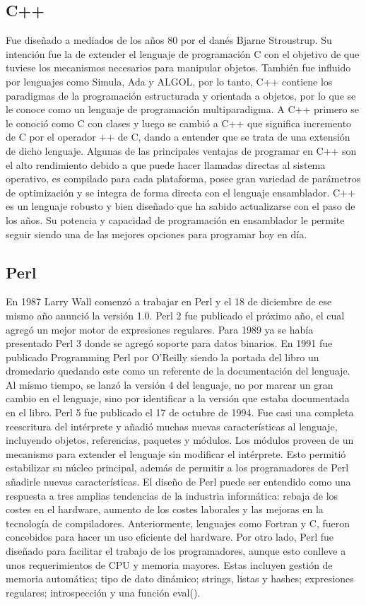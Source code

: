 \documentclass[twoside,twocolumn]{article}
\begin{document}
\subsection{C++}
Fue diseñado a mediados de los años 80 por el danés Bjarne Stroustrup. Su intención fue la de extender el lenguaje de programación C con el objetivo de que tuviese los mecanismos necesarios para manipular objetos. También fue influido por lenguajes como Simula, Ada y ALGOL, por lo tanto, C++ contiene los paradigmas de la programación estructurada y orientada a objetos, por lo que se le conoce como un lenguaje de programación multiparadigma. A C++ primero se le conoció como C con clases y luego se cambió a C++ que significa incremento de C por el operador ++ de C, dando a entender que se trata de una extensión de dicho lenguaje. Algunas de las principales ventajas de programar en C++ son el alto rendimiento debido a que puede hacer llamadas directas al sistema operativo, es compilado para cada plataforma, posee gran variedad de parámetros de optimización y se integra de forma directa con el lenguaje ensamblador. C++ es un lenguaje robusto y bien diseñado que ha sabido actualizarse con el paso de los años. Su potencia y capacidad de programación en ensamblador le permite seguir siendo una de las mejores opciones para programar hoy en día.



\subsection{Perl}
En 1987 Larry Wall comenzó a trabajar en Perl y el 18 de diciembre de ese mismo año anunció la versión 1.0. Perl 2 fue publicado el próximo año, el cual agregó un mejor motor de expresiones regulares. Para 1989 ya se había presentado Perl 3 donde se agregó soporte para datos binarios. En 1991 fue publicado Programming Perl por O’Reilly siendo la portada del libro un dromedario quedando este como un referente de la documentación del lenguaje. Al mismo tiempo, se lanzó la versión 4 del lenguaje, no por marcar un gran cambio en el lenguaje, sino por identificar a la versión que estaba documentada en el libro. Perl 5 fue publicado el 17 de octubre de 1994. Fue casi una completa reescritura del intérprete y añadió muchas nuevas características al lenguaje, incluyendo objetos, referencias, paquetes y módulos. Los módulos proveen de un mecanismo para extender el lenguaje sin modificar el intérprete. Esto permitió estabilizar su núcleo principal, además de permitir a los programadores de Perl añadirle nuevas características. El diseño de Perl puede ser entendido como una respuesta a tres amplias tendencias de la industria informática: rebaja de los costes en el hardware, aumento de los costes laborales y las mejoras en la tecnología de compiladores. Anteriormente, lenguajes como Fortran y C, fueron concebidos para hacer un uso eficiente del hardware. Por otro lado, Perl fue diseñado para facilitar el trabajo de los programadores, aunque esto conlleve a unos requerimientos de CPU y memoria mayores. Estas incluyen gestión de memoria automática; tipo de dato dinámico; strings, listas y hashes; expresiones regulares; introspección y una función eval().
\end{document}
